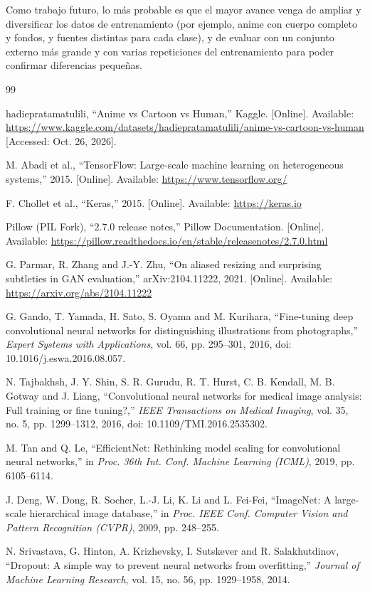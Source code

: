 \documentclass[letterpaper, 10 pt]{IEEEconf}
\begin{document}
Como trabajo futuro, lo más probable es que el mayor avance venga de ampliar y diversificar los datos de entrenamiento (por ejemplo, anime con cuerpo completo y fondos, y fuentes distintas para cada clase), y de evaluar con un conjunto externo más grande y con varias repeticiones del entrenamiento para poder confirmar diferencias pequeñas.


\begin{thebibliography}{99}

hadiepratamatulili, ``Anime vs Cartoon vs Human,'' Kaggle.
[Online]. Available:
\url{https://www.kaggle.com/datasets/hadiepratamatulili/anime-vs-cartoon-vs-human}
[Accessed: Oct. 26, 2026].

M. Abadi et al., ``TensorFlow: Large-scale machine learning on heterogeneous systems,'' 2015.
[Online]. Available: \url{https://www.tensorflow.org/}

F. Chollet et al., ``Keras,'' 2015.
[Online]. Available: \url{https://keras.io}

Pillow (PIL Fork), ``2.7.0 release notes,'' Pillow Documentation.
[Online]. Available: \url{https://pillow.readthedocs.io/en/stable/releasenotes/2.7.0.html}

G. Parmar, R. Zhang and J.-Y. Zhu, ``On aliased resizing and surprising subtleties in GAN evaluation,'' arXiv:2104.11222, 2021.
[Online]. Available: \url{https://arxiv.org/abs/2104.11222}

G. Gando, T. Yamada, H. Sato, S. Oyama and M. Kurihara, ``Fine-tuning deep convolutional neural networks for distinguishing illustrations from photographs,'' \textit{Expert Systems with Applications}, vol. 66, pp. 295--301, 2016, doi: 10.1016/j.eswa.2016.08.057.

N. Tajbakhsh, J. Y. Shin, S. R. Gurudu, R. T. Hurst, C. B. Kendall, M. B. Gotway and J. Liang, ``Convolutional neural networks for medical image analysis: Full training or fine tuning?,'' \textit{IEEE Transactions on Medical Imaging}, vol. 35, no. 5, pp. 1299--1312, 2016, doi: 10.1109/TMI.2016.2535302.

M. Tan and Q. Le, ``EfficientNet: Rethinking model scaling for convolutional neural networks,'' in \textit{Proc. 36th Int. Conf. Machine Learning (ICML)}, 2019, pp. 6105--6114.

J. Deng, W. Dong, R. Socher, L.-J. Li, K. Li and L. Fei-Fei, ``ImageNet: A large-scale hierarchical image database,'' in \textit{Proc. IEEE Conf. Computer Vision and Pattern Recognition (CVPR)}, 2009, pp. 248--255.

N. Srivastava, G. Hinton, A. Krizhevsky, I. Sutskever and R. Salakhutdinov, ``Dropout: A simple way to prevent neural networks from overfitting,'' \textit{Journal of Machine Learning Research}, vol. 15, no. 56, pp. 1929--1958, 2014.

\end{thebibliography}
\end{document}

